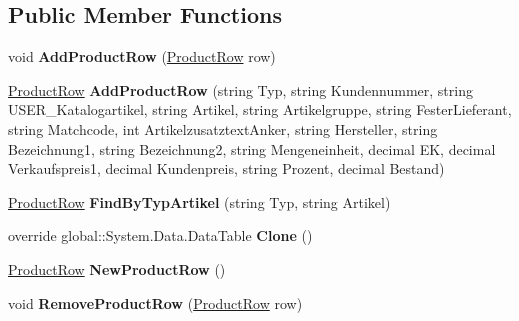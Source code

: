 \subsection*{Public Member Functions}
\begin{DoxyCompactItemize}
\item 
void {\bfseries Add\+Product\+Row} (\hyperlink{class_products_1_1_data_1_1ds_sage_1_1_product_row}{Product\+Row} row)\hypertarget{class_products_1_1_data_1_1ds_sage_1_1_product_data_table_a107c45d9d50866ee826aa884f9001f95}{}\label{class_products_1_1_data_1_1ds_sage_1_1_product_data_table_a107c45d9d50866ee826aa884f9001f95}

\item 
\hyperlink{class_products_1_1_data_1_1ds_sage_1_1_product_row}{Product\+Row} {\bfseries Add\+Product\+Row} (string Typ, string Kundennummer, string U\+S\+E\+R\+\_\+\+Katalogartikel, string Artikel, string Artikelgruppe, string Fester\+Lieferant, string Matchcode, int Artikelzusatztext\+Anker, string Hersteller, string Bezeichnung1, string Bezeichnung2, string Mengeneinheit, decimal EK, decimal Verkaufspreis1, decimal Kundenpreis, string Prozent, decimal Bestand)\hypertarget{class_products_1_1_data_1_1ds_sage_1_1_product_data_table_a9715dc5dec2d5b9c5fc19b7eabdc2ab9}{}\label{class_products_1_1_data_1_1ds_sage_1_1_product_data_table_a9715dc5dec2d5b9c5fc19b7eabdc2ab9}

\item 
\hyperlink{class_products_1_1_data_1_1ds_sage_1_1_product_row}{Product\+Row} {\bfseries Find\+By\+Typ\+Artikel} (string Typ, string Artikel)\hypertarget{class_products_1_1_data_1_1ds_sage_1_1_product_data_table_a6ec905f48bb366509ad7c364592e1e41}{}\label{class_products_1_1_data_1_1ds_sage_1_1_product_data_table_a6ec905f48bb366509ad7c364592e1e41}

\item 
override global\+::\+System.\+Data.\+Data\+Table {\bfseries Clone} ()\hypertarget{class_products_1_1_data_1_1ds_sage_1_1_product_data_table_adbf728e7696c8fb8a0d4ff1678ce0f3b}{}\label{class_products_1_1_data_1_1ds_sage_1_1_product_data_table_adbf728e7696c8fb8a0d4ff1678ce0f3b}

\item 
\hyperlink{class_products_1_1_data_1_1ds_sage_1_1_product_row}{Product\+Row} {\bfseries New\+Product\+Row} ()\hypertarget{class_products_1_1_data_1_1ds_sage_1_1_product_data_table_a41209df63eb876986bb8f9f012c0e3f2}{}\label{class_products_1_1_data_1_1ds_sage_1_1_product_data_table_a41209df63eb876986bb8f9f012c0e3f2}

\item 
void {\bfseries Remove\+Product\+Row} (\hyperlink{class_products_1_1_data_1_1ds_sage_1_1_product_row}{Product\+Row} row)\hypertarget{class_products_1_1_data_1_1ds_sage_1_1_product_data_table_adee3f9f86722f6eeec03fc15b6b8d5e1}{}\label{class_products_1_1_data_1_1ds_sage_1_1_product_data_table_adee3f9f86722f6eeec03fc15b6b8d5e1}

\end{DoxyCompactItemize}

